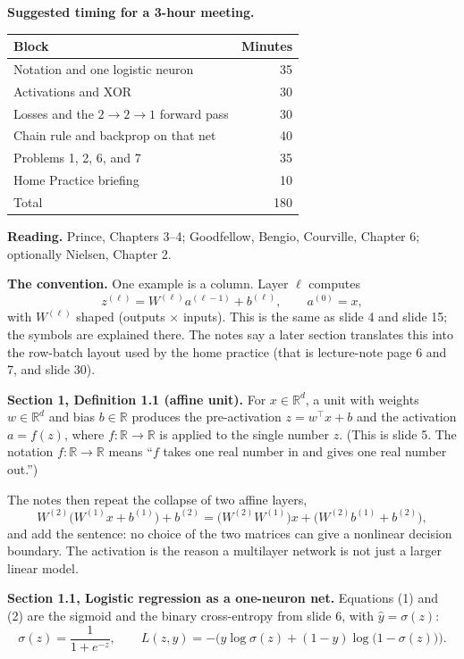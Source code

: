 \textbf{Suggested timing for a 3-hour meeting.}
\begin{center}
\begin{tabular}{p{9.0cm}r}
\toprule
Block & Minutes \\
\midrule
Notation and one logistic neuron & 35 \\
Activations and XOR & 30 \\
Losses and the $2\to2\to1$ forward pass & 30 \\
Chain rule and backprop on that net & 40 \\
Problems 1, 2, 6, and 7 & 35 \\
Home Practice briefing & 10 \\
\midrule
Total & 180 \\
\bottomrule
\end{tabular}
\end{center}

\textbf{Reading.} Prince, Chapters 3--4; Goodfellow, Bengio, Courville, Chapter 6; optionally Nielsen, Chapter 2.

\textbf{The convention.} One example is a column. Layer $\ell$ computes
\[
z^{(\ell)}=W^{(\ell)}a^{(\ell-1)}+b^{(\ell)}, \qquad a^{(0)}=x,
\]
with $W^{(\ell)}$ shaped (outputs $\times$ inputs). This is the same as slide 4 and slide 15; the symbols are explained there. The notes say a later section translates this into the row-batch layout used by the home practice (that is lecture-note page 6 and 7, and slide 30).

\textbf{Section 1, Definition 1.1 (affine unit).} For $x\in\mathbb{R}^d$, a unit with weights $w\in\mathbb{R}^d$ and bias $b\in\mathbb{R}$ produces the pre-activation $z=w^\top x+b$ and the activation $a=f(z)$, where $f:\mathbb{R}\to\mathbb{R}$ is applied to the single number $z$. (This is slide 5. The notation $f:\mathbb{R}\to\mathbb{R}$ means ``$f$ takes one real number in and gives one real number out.'')

The notes then repeat the collapse of two affine layers,
\[
W^{(2)}\big(W^{(1)}x+b^{(1)}\big)+b^{(2)}=\big(W^{(2)}W^{(1)}\big)x+\big(W^{(2)}b^{(1)}+b^{(2)}\big),
\]
and add the sentence: no choice of the two matrices can give a nonlinear decision boundary. The activation is the reason a multilayer network is not just a larger linear model.

\textbf{Section 1.1, Logistic regression as a one-neuron net.} Equations (1) and (2) are the sigmoid and the binary cross-entropy from slide 6, with $\hat{y}=\sigma(z)$:
\[
\sigma(z)=\frac{1}{1+e^{-z}}, \qquad L(z,y)=-\Big(y\log\sigma(z)+(1-y)\log\big(1-\sigma(z)\big)\Big).
\]

